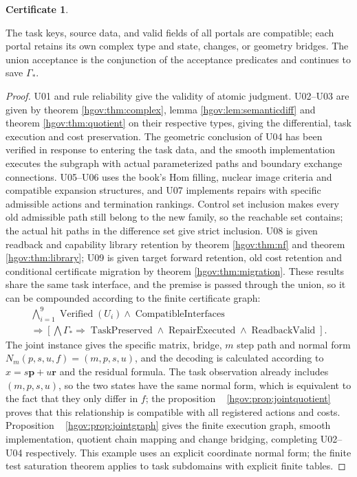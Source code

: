 \documentclass[12pt,a4paper,openany,notitlepage]{report}
\theoremstyle{plain}
\theoremstyle{definition}
\newtheorem*{certificate}{Certificate}
\theoremstyle{remark}
\begin{document}
\begin{CJK*}
\begin{certificate}
\begin{center}
\end{center}
The task keys, source data, and valid fields of all portals are compatible; each portal retains its own complex type and state, changes, or geometry bridges. The union acceptance is the conjunction of the acceptance predicates and continues to save $\Gamma_*$.\end{certificate}
\begin{proof}
U01 and rule reliability give the validity of atomic judgment. U02--U03 are given by theorem \ref{hgov:thm:complex}, lemma \ref{hgov:lem:semanticdiff} and theorem \ref{hgov:thm:quotient} on their respective types, giving the differential, task execution and cost preservation. The geometric conclusion of U04 has been verified in response to entering the task data, and the smooth implementation executes the subgraph with actual parameterized paths and boundary exchange connections. U05--U06 uses the book's Hom filling, nuclear image criteria and compatible expansion structures, and U07 implements repairs with specific admissible actions and termination rankings. Control set inclusion makes every old admissible path still belong to the new family, so the reachable set contains; the actual hit paths in the difference set give strict inclusion. U08 is given readback and capability library retention by theorem \ref{hgov:thm:nf} and theorem \ref{hgov:thm:library}; U09 is given target forward retention, old cost retention and conditional certificate migration by theorem \ref{hgov:thm:migration}. These results share the same task interface, and the premise is passed through the union, so it can be compounded according to the finite certificate graph: \[
\begin{gathered}
\bigwedge_{i=1}^{9}\operatorname{Verified}(U_i)
\land\operatorname{CompatibleInterfaces}\\
\Rightarrow
\left[
\bigwedge\Gamma_*\Rightarrow
\operatorname{TaskPreserved}
\land\operatorname{RepairExecuted}
\land\operatorname{ReadbackValid}
\right].
\end{gathered}
\] The joint instance gives the specific matrix, bridge, $m$ step path and normal form $N_m(p,s,u,f)=(m,p,s,u)$, and the decoding is calculated according to $x=s\mathbf p+u\mathbf r$ and the residual formula. The task observation already includes $(m,p,s,u)$, so the two states have the same normal form, which is equivalent to the fact that they only differ in $f$; the proposition ~ \ref{hgov:prop:jointquotient} proves that this relationship is compatible with all registered actions and costs. Proposition ~ \ref{hgov:prop:jointgraph} gives the finite execution graph, smooth implementation, quotient chain mapping and change bridging, completing U02--U04 respectively. This example uses an explicit coordinate normal form; the finite test saturation theorem applies to task subdomains with explicit finite tables.


\end{proof}
\end{CJK*}
\end{document}
